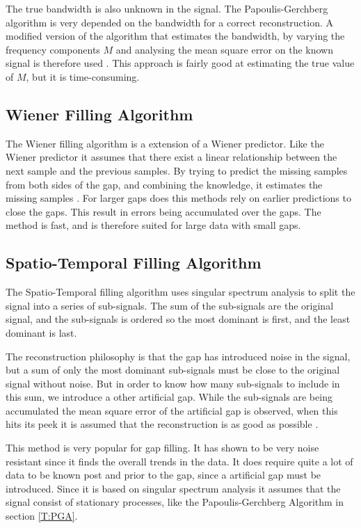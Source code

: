 The true bandwidth is also unknown in the signal. The Papoulis-Gerchberg algorithm is very depended on the bandwidth for a correct reconstruction. A modified version of the algorithm that estimates the bandwidth, by varying the frequency components $M$ and analysing the mean square error on the known signal is therefore used \cite{RefWorks:13}. This approach is fairly good at estimating the true value of $M$, but it is time-consuming.

\subsection{Wiener Filling Algorithm}
The Wiener filling algorithm is a extension of a Wiener predictor. Like the Wiener predictor it assumes that there exist a linear relationship between the next sample and the previous samples. By trying to predict the missing samples from both sides of the gap, and combining the knowledge, it estimates the missing samples \citep{RefWorks:14}. For larger gaps does this methods rely on earlier predictions to close the gaps. This result in errors being accumulated over the gaps. The method is fast, and is therefore suited for large data with small gaps. 

\subsection{Spatio-Temporal Filling Algorithm}
The Spatio-Temporal filling algorithm uses singular spectrum analysis to split the signal into a series of sub-signals. The sum of the sub-signals are the original signal, and the sub-signals is ordered so the most dominant is first, and the least dominant is last. 

The reconstruction philosophy is that the gap has introduced noise in the signal, but a sum of only the most dominant sub-signals must be close to the original signal without noise. But in order to know how many sub-signals to include in this sum, we introduce a other artificial gap. While the sub-signals are being accumulated the mean square error of the artificial gap is observed, when this hits its peek it is assumed that the reconstruction is as good as possible \cite{RefWorks:15}.

This method is very popular for gap filling. It has shown to be very noise resistant since it finds the overall trends in the data. It does require quite a lot of data to be known post and prior to the gap, since a artificial gap must be introduced. Since it is based on singular spectrum analysis it assumes that the signal consist of stationary processes, like the Papoulis-Gerchberg Algorithm in section \ref{T:PGA}.

